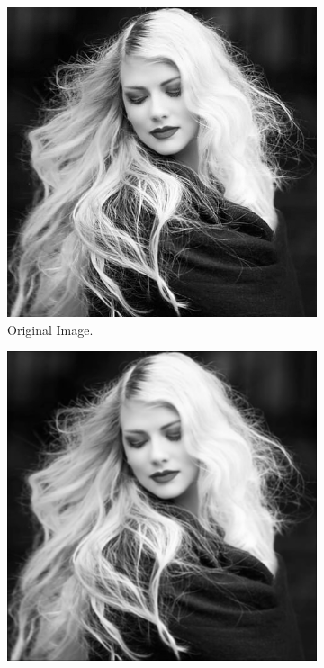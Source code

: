 \documentclass[14pt]{article}
\begin{document}
	\begin{figure}[hbt!]
		\centering
		\begin{subfigure}[b]{0.23\linewidth}
			\includegraphics[width=\linewidth]{origin.png}
			\caption{Original Image.}
		\end{subfigure}
		\begin{subfigure}[b]{0.23\linewidth}
			\includegraphics[width=\linewidth]{ones3.png}

\end{subfigure}
\end{figure}
\end{document}
